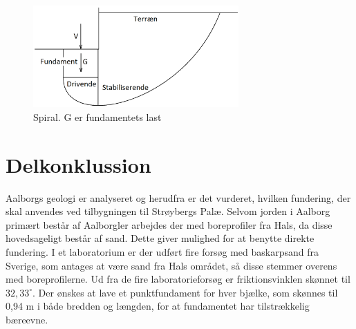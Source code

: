 \begin{figure}[htbp]
	\centering
	\includegraphics[width=0.7\textwidth]{billeder/spiral.png}
	\caption{Spiral. G er fundamentets last}
	\label{fig:haha}
\end{figure}

\section{Delkonklussion}
Aalborgs geologi er analyseret og herudfra er det vurderet, hvilken fundering, der skal anvendes ved tilbygningen til Strøybergs Palæ. Selvom jorden i Aalborg primært består af Aalborgler arbejdes der med boreprofiler fra Hals, da disse hovedsageligt består af sand. Dette giver mulighed for at benytte direkte fundering. I et laboratorium er der udført fire forsøg med baskarpsand fra Sverige, som antages at være sand fra Hals området, så disse stemmer overens med boreprofilerne. Ud fra de fire laboratorieforsøg er friktionsvinklen skønnet til $32,\!33^{\circ}$. Der ønskes at lave et punktfundament for hver bjælke, som skønnes til 0,94 m i både bredden og længden, for at fundamentet har tilstrækkelig bæreevne.